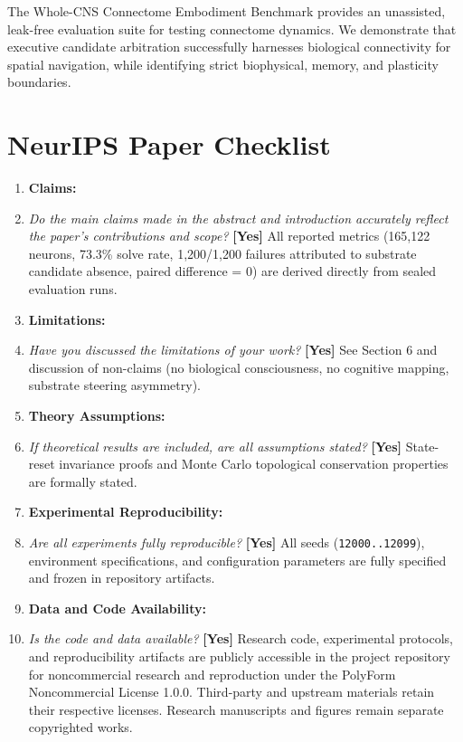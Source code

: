 \documentclass{article}
\begin{document}
The Whole-CNS Connectome Embodiment Benchmark provides an unassisted, leak-free evaluation suite for testing connectome dynamics. We demonstrate that executive candidate arbitration successfully harnesses biological connectivity for spatial navigation, while identifying strict biophysical, memory, and plasticity boundaries.




\newpage
\section*{NeurIPS Paper Checklist}

\begin{enumerate}
\item \textbf{Claims:}
  \item[] \textit{Do the main claims made in the abstract and introduction accurately reflect the paper's contributions and scope?} \textbf{[Yes]} All reported metrics (165,122 neurons, 73.3\% solve rate, 1,200/1,200 failures attributed to substrate candidate absence, paired difference = 0) are derived directly from sealed evaluation runs.
\item \textbf{Limitations:}
  \item[] \textit{Have you discussed the limitations of your work?} \textbf{[Yes]} See Section 6 and discussion of non-claims (no biological consciousness, no cognitive mapping, substrate steering asymmetry).
\item \textbf{Theory Assumptions:}
  \item[] \textit{If theoretical results are included, are all assumptions stated?} \textbf{[Yes]} State-reset invariance proofs and Monte Carlo topological conservation properties are formally stated.
\item \textbf{Experimental Reproducibility:}
  \item[] \textit{Are all experiments fully reproducible?} \textbf{[Yes]} All seeds (\texttt{12000..12099}), environment specifications, and configuration parameters are fully specified and frozen in repository artifacts.
\item \textbf{Data and Code Availability:}
  \item[] \textit{Is the code and data available?} \textbf{[Yes]} Research code, experimental protocols, and reproducibility artifacts are publicly accessible in the project repository for noncommercial research and reproduction under the PolyForm Noncommercial License 1.0.0. Third-party and upstream materials retain their respective licenses. Research manuscripts and figures remain separate copyrighted works.

\end{enumerate}
\end{document}
